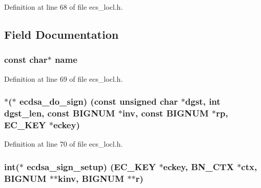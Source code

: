 Definition at line 68 of file ecs\+\_\+locl.\+h.



\subsection{Field Documentation}
\subsubsection[{\texorpdfstring{name}{name}}]{\setlength{\rightskip}{0pt plus 5cm}const char$\ast$ name}\hypertarget{structecdsa__method_a8f8f80d37794cde9472343e4487ba3eb}{}\label{structecdsa__method_a8f8f80d37794cde9472343e4487ba3eb}


Definition at line 69 of file ecs\+\_\+locl.\+h.

\subsubsection[{\texorpdfstring{ecdsa\+\_\+do\+\_\+sign}{ecdsa_do_sign}}]{$\ast$($\ast$ ecdsa\+\_\+do\+\_\+sign) (const unsigned char $\ast$dgst, int dgst\+\_\+len, const {\bf B\+I\+G\+N\+UM} $\ast$inv, const {\bf B\+I\+G\+N\+UM} $\ast$rp, {\bf E\+C\+\_\+\+K\+EY} $\ast$eckey)}\hypertarget{structecdsa__method_aa135cd0d57241f79212c805c8ceaad74}{}\label{structecdsa__method_aa135cd0d57241f79212c805c8ceaad74}


Definition at line 70 of file ecs\+\_\+locl.\+h.

\subsubsection[{\texorpdfstring{ecdsa\+\_\+sign\+\_\+setup}{ecdsa_sign_setup}}]{\setlength{\rightskip}{0pt plus 5cm}int($\ast$ ecdsa\+\_\+sign\+\_\+setup) ({\bf E\+C\+\_\+\+K\+EY} $\ast$eckey, {\bf B\+N\+\_\+\+C\+TX} $\ast$ctx, {\bf B\+I\+G\+N\+UM} $\ast$$\ast$kinv, {\bf B\+I\+G\+N\+UM} $\ast$$\ast$r)}\hypertarget{structecdsa__method_a1849a5b5ecafde08839a11e236a67dc3}{}\label{structecdsa__method_a1849a5b5ecafde08839a11e236a67dc3}


